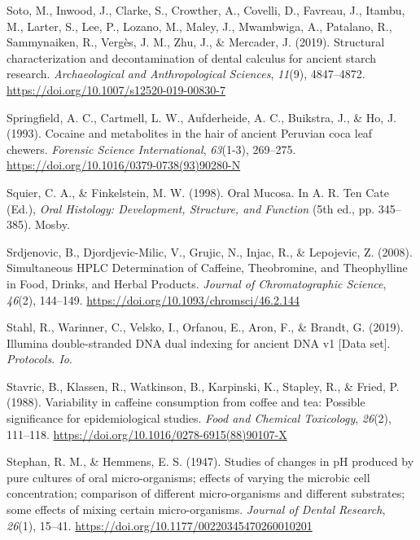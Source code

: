 \documentclass[
  letterpaper,
]{book}
\newlength{\cslhangindent}
\newlength{\cslentryspacingunit} %
\newenvironment{CSLReferences}[2] %
 {%
  \setlength{\parindent}{0pt}
  \ifodd #1
  \let\oldpar\par
  \def\par{\hangindent=\cslhangindent\oldpar}
  \fi
  \setlength{\parskip}{#2\cslentryspacingunit}
 }%
 {}
\begin{document}
\begin{CSLReferences}{1}{0}
\leavevmode{}%
Soto, M., Inwood, J., Clarke, S., Crowther, A., Covelli, D., Favreau,
J., Itambu, M., Larter, S., Lee, P., Lozano, M., Maley, J., Mwambwiga,
A., Patalano, R., Sammynaiken, R., Vergès, J. M., Zhu, J., \& Mercader,
J. (2019). Structural characterization and decontamination of dental
calculus for ancient starch research. \emph{Archaeological and
Anthropological Sciences}, \emph{11}(9), 4847--4872.
\url{https://doi.org/10.1007/s12520-019-00830-7}

\leavevmode{}%
Springfield, A. C., Cartmell, L. W., Aufderheide, A. C., Buikstra, J.,
\& Ho, J. (1993). Cocaine and metabolites in the hair of ancient
{Peruvian} coca leaf chewers. \emph{Forensic Science International},
\emph{63}(1-3), 269--275.
\url{https://doi.org/10.1016/0379-0738(93)90280-N}

\leavevmode{}%
Squier, C. A., \& Finkelstein, M. W. (1998). Oral {Mucosa}. In A. R. Ten
Cate (Ed.), \emph{Oral {Histology}: {Development}, {Structure}, and
{Function}} (5th ed., pp. 345--385). {Mosby}.

\leavevmode{}%
Srdjenovic, B., Djordjevic-Milic, V., Grujic, N., Injac, R., \&
Lepojevic, Z. (2008). Simultaneous {HPLC Determination} of {Caffeine},
{Theobromine}, and {Theophylline} in {Food}, {Drinks}, and {Herbal
Products}. \emph{Journal of Chromatographic Science}, \emph{46}(2),
144--149. \url{https://doi.org/10.1093/chromsci/46.2.144}

\leavevmode{}%
Stahl, R., Warinner, C., Velsko, I., Orfanou, E., Aron, F., \& Brandt,
G. (2019). Illumina double-stranded {DNA} dual indexing for ancient
{DNA} v1 {[}{Data} set{]}. \emph{Protocols. Io}.

\leavevmode{}%
Stavric, B., Klassen, R., Watkinson, B., Karpinski, K., Stapley, R., \&
Fried, P. (1988). Variability in caffeine consumption from coffee and
tea: {Possible} significance for epidemiological studies. \emph{Food and
Chemical Toxicology}, \emph{26}(2), 111--118.
\url{https://doi.org/10.1016/0278-6915(88)90107-X}

\leavevmode{}%
Stephan, R. M., \& Hemmens, E. S. (1947). Studies of changes in {pH}
produced by pure cultures of oral micro-organisms; effects of varying
the microbic cell concentration; comparison of different micro-organisms
and different substrates; some effects of mixing certain
micro-organisms. \emph{Journal of Dental Research}, \emph{26}(1),
15--41. \url{https://doi.org/10.1177/00220345470260010201}


\end{CSLReferences}
\end{document}
